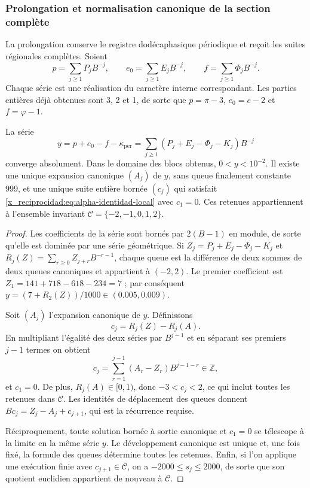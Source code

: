 \subsubsection{Prolongation et normalisation canonique de la section complète}
\label{x_reciprocidad:subsec:alpha-completa}

La prolongation conserve le registre dodécaphasique périodique et reçoit les suites
régionales complètes. Soient
\[
 p=\sum_{j\geq1}P_jB^{-j},\qquad
 e_0=\sum_{j\geq1}E_jB^{-j},\qquad
 f=\sum_{j\geq1}\Phi_jB^{-j}.
\]
Chaque série est une réalisation du caractère interne correspondant.  
Les parties entières déjà obtenues sont 3, 2 et 1, de sorte que  
\(p=\pi-3\), \(e_0=e-2\) et  
\(f=\varphi-1\).

\begin{proposition}
\label{x_reciprocidad:prop:alpha-normalizacion}
La série
\begin{equation}
 y=p+e_0-f-\kappa_{\mathrm{per}}
   =\sum_{j\geq1}(P_j+E_j-\Phi_j-K_j)B^{-j}
 \label{x_reciprocidad:eq:alpha-serie}
\end{equation}
converge absolument. Dans le domaine des blocs obtenus,
\(0<y<10^{-2}\). Il existe une unique expansion canonique \((A_j)\) de
\(y\), sans queue finalement constante 999, et une unique suite entière
bornée \((c_j)\) qui satisfait \eqref{x_reciprocidad:eq:alpha-identidad-local} avec
\(c_1=0\). Ces retenues appartiennent à l'ensemble invariant
\(\mathcal C=\{-2,-1,0,1,2\}\).
\end{proposition}

\begin{proof}
Les coefficients de la série sont bornés par \(2(B-1)\) en module,  
de sorte qu'elle est dominée par une série géométrique. Si  
\(Z_j=P_j+E_j-\Phi_j-K_j\) et  
\(R_j(Z)=\sum_{r\geq0}Z_{j+r}B^{-r-1}\), chaque queue est la différence  
de deux sommes de deux queues canoniques et appartient à \((-2,2)\).  
Le premier coefficient est  
\(Z_1=141+718-618-234=7\) ; par conséquent  
\(y=(7+R_2(Z))/1000\in(0.005,0.009)\).

Soit \((A_j)\) l'expansion canonique de \(y\). Définissons
\[
 c_j=R_j(Z)-R_j(A).
\]
En multipliant l'égalité des deux séries par \(B^{j-1}\) et en séparant
ses premiers \(j-1\) termes on obtient
\[
 c_j=\sum_{r=1}^{j-1}(A_r-Z_r)B^{j-1-r}\in\mathbb Z,
\]
et \(c_1=0\). De plus, \(R_j(A)\in[0,1)\), donc
\(-3<c_j<2\), ce qui inclut toutes les retenues dans \(\mathcal C\).
Les identités de déplacement des queues donnent
\(Bc_j=Z_j-A_j+c_{j+1}\), qui est la récurrence requise.

Réciproquement, toute solution bornée à sortie canonique et
\(c_1=0\) se télescope à la limite en la même série \(y\). Le développement
canonique est unique et, une fois fixé, la formule des queues détermine
toutes les retenues. Enfin, si l'on applique une exécution finie avec
\(c_{j+1}\in\mathcal C\), on a \(-2000\leq s_j\leq2000\),
de sorte que son quotient euclidien appartient de nouveau à \(\mathcal C\).
\end{proof}

